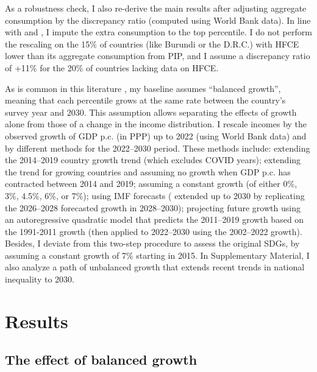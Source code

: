 \documentclass[12pt,english]{article}
\begin{document}
As a robustness check, I also re-derive the main results after adjusting aggregate consumption by the discrepancy ratio (computed using World Bank data). In line with \cite{lakner_global_2013} and \cite{anand_chapter_2015}, I impute the extra consumption to the top percentile. I do not perform the rescaling on the 15\% of countries (like Burundi or the D.R.C.) with HFCE lower than its aggregate consumption from PIP, and I assume a discrepancy ratio of +11\% for the 20\% of countries lacking data on HFCE. 

As is common in this literature \citep{karver_mdgs_2012,hellebrandt_future_2015,bicaba_can_2017}, my baseline assumes ``balanced growth'', meaning that each percentile grows at the same rate between the country's survey year and 2030. This assumption allows separating the effects of growth alone from those of a change in the income distribution. 
I rescale incomes by the observed growth of GDP p.c. (in PPP) up to 2022 (using World Bank data) and by different methods for the 2022--2030 period. 
These methods include: extending the 2014--2019 country growth trend (which excludes COVID years); extending the trend for growing countries and assuming no growth when GDP p.c. has contracted between 2014 and 2019; assuming a constant growth (of either 0\%, 3\%, 4.5\%, 6\%, or 7\%); using IMF forecasts (\cite{imf_world_2023} extended up to 2030 by replicating the 2026--2028 forecasted growth in 2028--2030); projecting future growth using an autoregressive quadratic model that predicts the 2011--2019 growth based on the 1991-2011 growth (then applied to 2022--2030 using the 2002--2022 growth). Besides, I deviate from this two-step procedure to assess the original SDGs, 
by assuming a constant growth of 7\% starting in 2015. In Supplementary Material, I also analyze a path of unbalanced growth that extends recent trends in national inequality to 2030.  

\section{Results\label{sec:results}}
\subsection{The effect of balanced growth\label{subsec:balanced_growth}}
\end{document}
